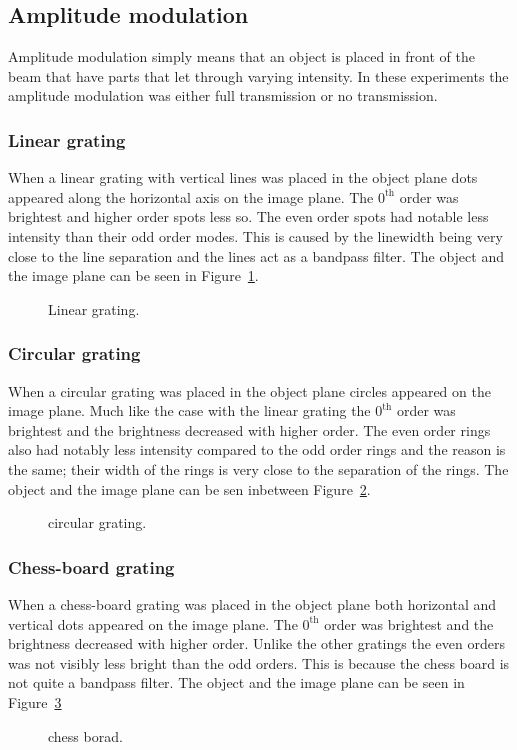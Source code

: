 \documentclass[12pt,a4paper]{article}
\begin{document}
\subsection{Amplitude modulation}\label{sec:ampmod}
Amplitude modulation simply means that an object is placed in front of the beam that have parts that let through varying intensity. In these experiments the amplitude modulation was either full transmission or no transmission.
\subsubsection{Linear grating}
When a linear grating with vertical lines was placed in the object plane dots appeared along the horizontal axis on the image plane. The $0^\text{th}$ order was brightest and higher order spots less so. The even order spots had notable less intensity than their odd order modes. This is caused by the linewidth being very close to the line separation and the lines act as a bandpass filter. The object and the image plane can be seen in Figure~\ref{fig:linear_grating}.
\begin{figure}
  \centering
  \noindent\makebox[\textwidth]{\scalebox{0.70}{}}
  \caption{Linear grating.}
  \label{fig:linear_grating}
\end{figure}

\subsubsection{Circular grating}
When a circular grating was placed in the object plane circles appeared on the image plane. Much like the case with the linear grating the $0^\text{th}$ order was brightest and the brightness decreased with higher order. The even order rings also had notably less intensity compared to the odd order rings and the reason is the same; their width of the rings is very close to the separation of the rings. The object and the image plane can be sen inbetween Figure~\ref{fig:circular_grating}.
\begin{figure}
  \centering
  \noindent\makebox[\textwidth]{\scalebox{0.70}{}}
  \caption{circular grating.}
  \label{fig:circular_grating}
\end{figure}

\subsubsection{Chess-board grating}
When a chess-board grating was placed in the object plane both horizontal and vertical dots appeared on the image plane. The $0^\text{th}$ order was brightest and the brightness decreased with higher order. Unlike the other gratings the even orders was not visibly less bright than the odd orders. This is because the chess board is not quite a bandpass filter. The object and the image plane can be seen in Figure~\ref{fig:chess_board}
\begin{figure}
  \centering
  \noindent\makebox[\textwidth]{\scalebox{0.70}{}}
  \caption{chess borad.}
  \label{fig:chess_board}
\end{figure}
\end{document}
